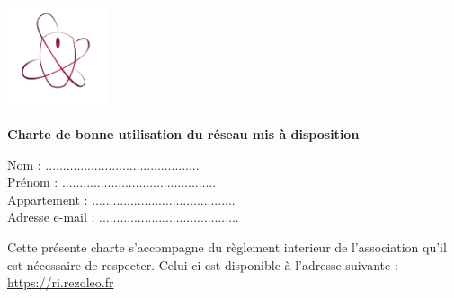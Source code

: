 \documentclass[12pt]{article}
\begin{document}
	
\thispagestyle{empty}

\begin{minipage}{0.15\linewidth}
	\includegraphics[height=3cm]{rezoleo.png}
\end{minipage}\hfill
\begin{minipage}{0.80\linewidth}
\LARGE \textbf{Charte de bonne utilisation du réseau mis à disposition}
\end{minipage}


\begin{flushright}
	Nom : ............................................\\
	Prénom : ............................................\\
	Appartement : .........................................\\
	Adresse e-mail : ........................................\\
\end{flushright}

\vspace*{0.5cm}

Cette présente charte s'accompagne du règlement interieur de l'association qu'il est nécessaire de respecter. Celui-ci est disponible à l'adresse suivante : \url{https://ri.rezoleo.fr}

\vspace*{0.5cm}
\end{document}
